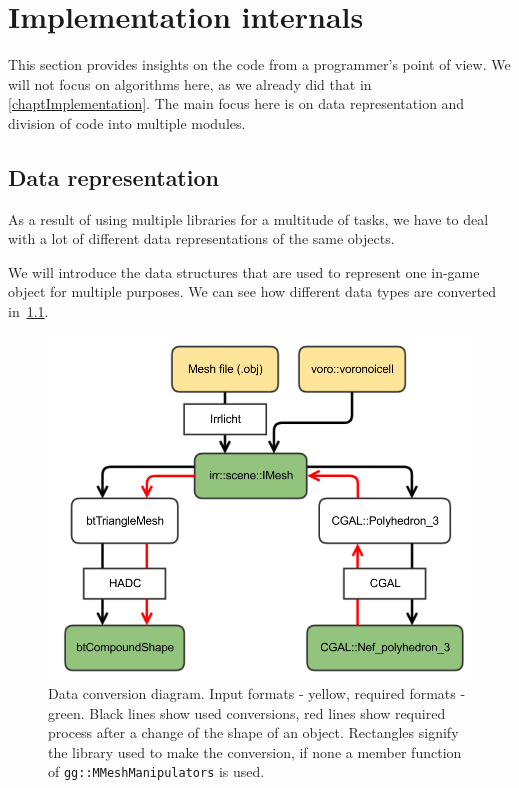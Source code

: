 \chapter{Implementation internals}
This section provides insights on the code from a programmer's point of view. We will not focus on algorithms here, as we already did that in \cref{chaptImplementation}. The main focus here is on data representation and division of code into multiple modules.

\section{Data representation}
As a result of using multiple libraries for a multitude of tasks, we have to deal with a lot of different data representations of the same objects. 

We will introduce the data structures that are used to represent one in-game object for multiple purposes. We can see how different data types are converted in~\cref{fig:conversions}.

\begin{figure}
        \centering
        \includegraphics[width=\textwidth]{img/conversions}
        \caption{Data conversion diagram. Input formats - yellow, required formats - green. Black lines show used conversions, red lines show required process after a change of the shape of an object. Rectangles signify the library used to make the conversion, if none a member function of {\tt gg::MMeshManipulators} is used.}
        \label{fig:conversions}
\end{figure}


